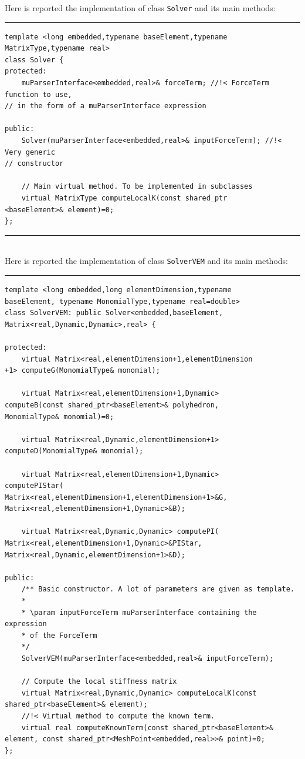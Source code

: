 Here is reported the implementation of class \verb|Solver| and its main methods:

\noindent\rule{16cm}{1pt}
\begin{lstlisting}[caption=File \texttt{Solver.h}]
template <long embedded,typename baseElement,typename 
MatrixType,typename real>
class Solver {
protected:
    muParserInterface<embedded,real>& forceTerm; //!< ForceTerm function to use, 
// in the form of a muParserInterface expression
	
public:
    Solver(muParserInterface<embedded,real>& inputForceTerm); //!< Very generic 
// constructor

    // Main virtual method. To be implemented in subclasses
    virtual MatrixType computeLocalK(const shared_ptr
<baseElement>& element)=0;
};
\end{lstlisting}

\noindent\rule{16cm}{1pt}\\

Here is reported the implementation of class \verb|SolverVEM| and its main methods:

\noindent\rule{16cm}{1pt}
\begin{lstlisting}[caption=File \texttt{SolverVEM.h}]
template <long embedded,long elementDimension,typename 
baseElement, typename MonomialType,typename real=double>
class SolverVEM: public Solver<embedded,baseElement,
Matrix<real,Dynamic,Dynamic>,real> {

protected:
    virtual Matrix<real,elementDimension+1,elementDimension
+1> computeG(MonomialType& monomial);

    virtual Matrix<real,elementDimension+1,Dynamic> 
computeB(const shared_ptr<baseElement>& polyhedron,
MonomialType& monomial)=0;

    virtual Matrix<real,Dynamic,elementDimension+1> 
computeD(MonomialType& monomial);
	
    virtual Matrix<real,elementDimension+1,Dynamic> 
computePIStar(
Matrix<real,elementDimension+1,elementDimension+1>&G,
Matrix<real,elementDimension+1,Dynamic>&B);

    virtual Matrix<real,Dynamic,Dynamic> computePI(
Matrix<real,elementDimension+1,Dynamic>&PIStar,
Matrix<real,Dynamic,elementDimension+1>&D);
	
public:
    /**	Basic constructor. A lot of parameters are given as template.
	*
	* \param inputForceTerm muParserInterface containing the expression 
	* of the ForceTerm
	*/
    SolverVEM(muParserInterface<embedded,real>& inputForceTerm);
	
    // Compute the local stiffness matrix
    virtual Matrix<real,Dynamic,Dynamic> computeLocalK(const
shared_ptr<baseElement>& element); 
    //!< Virtual method to compute the known term.
    virtual real computeKnownTerm(const shared_ptr<baseElement>& 
element, const shared_ptr<MeshPoint<embedded,real>>& point)=0; 
};
\end{lstlisting}

